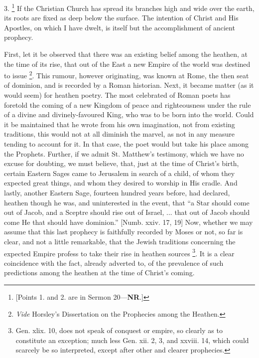 3. \footnote{[Points 1. and 2. are in Sermon 20—\textbf{NR}.]} If the Christian
Church has spread its branches high and wide over the earth, its roots
are fixed as deep below the surface. The intention of Christ and His
Apostles, on which I have dwelt, is itself but the accomplishment of
ancient prophecy.

First, let it be observed that there was an existing belief among the
heathen, at the time of its rise, that out of the East a new Empire of
the world was destined to issue \footnote{\emph{Vide} Horsley's Dissertation on the
Prophecies among the Heathen.}.
This rumour, however originating, was known at Rome, the then seat of
dominion, and is recorded by a Roman historian. Next, it became matter
(as it would seem) for heathen poetry. The most celebrated of Roman
poets has foretold the coming of a new Kingdom of peace and
righteousness under the rule of a divine and divinely-favoured King, who
was to be born into the world. Could it be maintained that he wrote from
his own imagination, not from existing traditions, this would not at all
diminish the marvel, as not in any measure tending to account for it. In
that case, the poet would but take his place among the Prophets.
Further, if we admit St. Matthew's testimony, which we have no excuse
for doubting, we must believe, that, just at the time of Christ's birth,
certain Eastern Sages came to Jerusalem in search of a child, of whom
they expected great things, and whom they desired to worship in His
cradle. And lastly, another Eastern Sage, fourteen hundred years before,
had declared, heathen though he was, and uninterested in the event, that
``a Star should come out of Jacob, and a Sceptre should rise out of
Israel, ... that out of Jacob should come He that should have
dominion.'' [Numb. xxiv. 17, 19] Now, whether we may assume that
this last prophecy is faithfully recorded by Moses or not, so far is
clear, and not a little remarkable, that the Jewish traditions
concerning the expected Empire profess to take their rise in heathen
sources \footnote{Gen. xlix. 10, does not speak of conquest or
empire, so clearly as to constitute an exception; much less Gen. xii. 2,
3, and xxviii. 14, which could scarcely be so interpreted, except after
other and clearer prophecies.}. It is a clear
coincidence with the fact, already adverted to, of the prevalence of
such predictions among the heathen at the time of Christ's coming.

